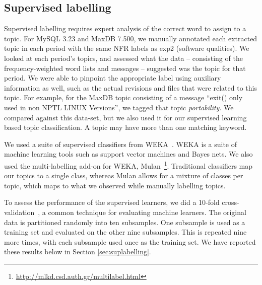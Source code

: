 \documentclass[]{sig-alternate}
\begin{document}
\subsection{Supervised labelling}
\label{sec:suplearn}
Supervised labelling requires expert analysis of the correct word to assign to a topic. %
 For MySQL 3.23 and MaxDB 7.500, we manually annotated each extracted topic in each period with the same NFR labels as \textsf{exp2} (software qualities). We looked at each period's topics, and assessed what the data -- consisting of the frequency-weighted word lists and messages -- suggested was the topic for that period. We were able to pinpoint the appropriate label using auxiliary information as well, such as the actual revisions and files that were related to this topic. For example, for the MaxDB topic consisting of a message ``exit() only used in non NPTL LINUX Versions'', we tagged that topic \emph{portability}. We compared against this data-set, but we also used it for our supervised learning based topic classification. A topic may have more than one matching keyword.

We used a suite of supervised classifiers from WEKA~\cite{weka09}. WEKA is a suite of machine learning tools such as support vector machines and Bayes nets. We also used the multi-labelling add-on for WEKA, Mulan~\cite{mulan}\footnote{\url{http://mlkd.csd.auth.gr/multilabel.html}}. Traditional classifiers map our topics to a single class, whereas Mulan allows for a mixture of classes per topic, which maps to what we observed while manually labelling topics.

To assess the performance of the supervised learners, we did a 10-fold cross-validation~\cite{Kohavi1995}, a common technique for evaluating machine learners. The original data is partitioned randomly into ten subsamples. One subsample is used as a training set and evaluated on the other nine subsamples. This is repeated nine more times, with each subsample used once as the training set. We have reported these results below in Section \ref{sec:suplabelling}.
\end{document}
